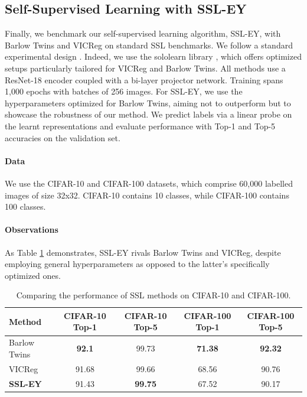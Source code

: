 \subsection{Self-Supervised Learning with SSL-EY}
Finally, we benchmark our self-supervised learning algorithm, SSL-EY, with Barlow Twins and VICReg on standard SSL benchmarks.
We follow a standard experimental design \citep{tong2023emp}.
Indeed, we use the sololearn library \citep{da2022solo}, which offers optimized setups particularly tailored for VICReg and Barlow Twins.
All methods use a ResNet-18 encoder coupled with a bi-layer projector network.
Training spans 1,000 epochs with batches of 256 images.
For SSL-EY, we use the hyperparameters optimized for Barlow Twins, aiming not to outperform but to showcase the robustness of our method.
We predict labels via a linear probe on the learnt representations and evaluate performance with Top-1 and Top-5 accuracies on the validation set.

\paragraph{Data} We use the CIFAR-10 and CIFAR-100 datasets, which comprise 60,000 labelled images of size 32x32.
CIFAR-10 contains 10 classes, while CIFAR-100 contains 100 classes.

\paragraph{Observations} As Table \ref{tab:selfsup} demonstrates, SSL-EY rivals Barlow Twins and VICReg, despite employing general hyperparameters as opposed to the latter's specifically optimized ones.

\begin{table}[H]
    \centering
    \begin{tabular}{lcccc}
        \hline
        Method          & CIFAR-10 Top-1 & CIFAR-10 Top-5 & CIFAR-100 Top-1 & CIFAR-100 Top-5 \\
        \hline
        Barlow Twins    & \textbf{92.1}  & 99.73          & \textbf{71.38}  & \textbf{92.32}  \\
        VICReg          & 91.68          & 99.66          & 68.56           & 90.76           \\
        \textbf{SSL-EY} & 91.43          & \textbf{99.75} & 67.52           & 90.17           \\
        \hline
    \end{tabular}
    \caption{Comparing the performance of SSL methods on CIFAR-10 and CIFAR-100.}
    \label{tab:selfsup}
\end{table}

